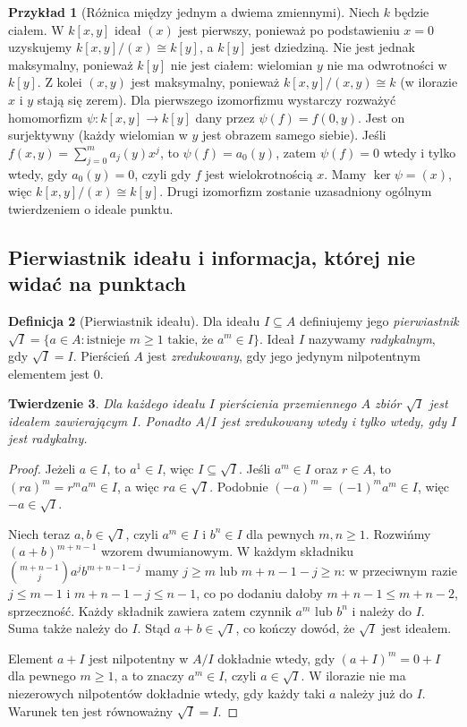 \documentclass[11pt,a4paper,openany]{report}
\numberwithin{equation}{section}
\theoremstyle{plain}
\newtheorem{twierdzenie}{Twierdzenie}[section]
\theoremstyle{definition}
\newtheorem{definicja}[twierdzenie]{Definicja}
\newtheorem{przyklad}[twierdzenie]{Przykład}
\theoremstyle{remark}
\newcommand{\kerf}{\operatorname{ker}}
\begin{document}
\begin{przyklad}[Różnica między jednym a dwiema zmiennymi]
Niech $k$ będzie ciałem. W $k[x,y]$ ideał $(x)$ jest pierwszy,
ponieważ po podstawieniu $x=0$ uzyskujemy
$k[x,y]/(x)\cong k[y]$, a $k[y]$ jest dziedziną.
Nie jest jednak maksymalny, ponieważ $k[y]$ nie jest ciałem:
wielomian $y$ nie ma odwrotności w $k[y]$.
Z kolei $(x,y)$ jest maksymalny, ponieważ
$k[x,y]/(x,y)\cong k$ (w ilorazie $x$ i $y$ stają się zerem).
Dla pierwszego izomorfizmu wystarczy rozważyć homomorfizm
$\psi\colon k[x,y]\to k[y]$ dany przez $\psi(f)=f(0,y)$.
Jest on surjektywny (każdy wielomian w $y$ jest obrazem samego siebie).
Jeśli $f(x,y)=\sum_{j=0}^m a_j(y)x^j$, to $\psi(f)=a_0(y)$,
zatem $\psi(f)=0$ wtedy i tylko wtedy, gdy $a_0(y)=0$,
czyli gdy $f$ jest wielokrotnością $x$. Mamy $\kerf\psi=(x)$,
więc $k[x,y]/(x)\cong k[y]$. Drugi izomorfizm zostanie
uzasadniony ogólnym twierdzeniem o ideale punktu.
\end{przyklad}

\subsection{Pierwiastnik ideału i informacja, której nie widać na punktach}

\begin{definicja}[Pierwiastnik ideału]
Dla ideału $I\subseteq A$ definiujemy jego \emph{pierwiastnik}
$\sqrt I=\{a\in A:\text{istnieje }m\ge1\text{ takie, że }a^m\in I\}$.
Ideał $I$ nazywamy \emph{radykalnym}, gdy $\sqrt I=I$.
Pierścień $A$ jest \emph{zredukowany}, gdy jego jedynym
nilpotentnym elementem jest $0$.
\end{definicja}

\begin{twierdzenie}
\label{tw:pierwiastek}
Dla każdego ideału $I$ pierścienia przemiennego $A$
zbiór $\sqrt I$ jest ideałem zawierającym $I$.
Ponadto $A/I$ jest zredukowany wtedy i tylko wtedy, gdy $I$ jest radykalny.
\end{twierdzenie}
\begin{proof}
Jeżeli $a\in I$, to $a^1\in I$, więc $I\subseteq\sqrt I$.
Jeśli $a^m\in I$ oraz $r\in A$, to $(ra)^m=r^ma^m\in I$,
a więc $ra\in\sqrt I$. Podobnie $(-a)^m=(-1)^ma^m\in I$,
więc $-a\in\sqrt I$.

Niech teraz $a,b\in\sqrt I$, czyli $a^m\in I$ i $b^n\in I$
dla pewnych $m,n\ge1$. Rozwińmy $(a+b)^{m+n-1}$
wzorem dwumianowym. W każdym składniku
$\binom{m+n-1}{j}a^jb^{m+n-1-j}$
mamy $j\ge m$ lub $m+n-1-j\ge n$:
w przeciwnym razie $j\le m-1$ i $m+n-1-j\le n-1$,
co po dodaniu dałoby $m+n-1\le m+n-2$, sprzeczność.
Każdy składnik zawiera zatem czynnik $a^m$ lub $b^n$
i należy do $I$. Suma także należy do $I$.
Stąd $a+b\in\sqrt I$, co kończy dowód, że $\sqrt I$ jest ideałem.

Element $a+I$ jest nilpotentny w $A/I$ dokładnie wtedy, gdy
$(a+I)^m=0+I$ dla pewnego $m\ge1$, a to znaczy $a^m\in I$,
czyli $a\in\sqrt I$. W ilorazie nie ma niezerowych nilpotentów
dokładnie wtedy, gdy każdy taki $a$ należy już do $I$.
Warunek ten jest równoważny $\sqrt I=I$.
\end{proof}
\end{document}

